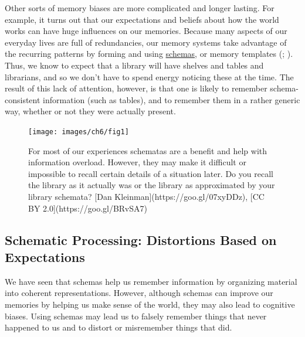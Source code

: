 \documentclass[
]{krantz}
\begin{document}
Other sorts of memory biases are more complicated and longer lasting. For example, it turns out that our expectations and beliefs about how the world works can have huge influences on our memories. Because many aspects of our everyday lives are full of redundancies, our memory systems take advantage of the recurring patterns by forming and using \hyperref[schema]{schemas}, or memory templates (; ). Thus, we know to expect that a library will have shelves and tables and librarians, and so we don't have to spend energy noticing these at the time. The result of this lack of attention, however, is that one is likely to remember schema-consistent information (such as tables), and to remember them in a rather generic way, whether or not they were actually present.

\begin{figure}

{\centering \texttt{[image: images/ch6/fig1]} 

}

\caption{For most of our experiences schematas are a benefit and help with information overload. However, they may make it difficult or impossible to recall certain details of a situation later. Do you recall the library as it actually was or the library as approximated by your library schemata? [Dan Kleinman](https://goo.gl/07xyDDz), [CC BY 2.0](https://goo.gl/BRvSA7)}\label{fig:library2}
\end{figure}

\subsection*{Schematic Processing: Distortions Based on Expectations}\label{schematic-processing-distortions-based-on-expectations}


We have seen that schemas help us remember information by organizing material into coherent representations. However, although schemas can improve our memories by helping us make sense of the world, they may also lead to cognitive biases. Using schemas may lead us to falsely remember things that never happened to us and to distort or misremember things that did.
\end{document}
